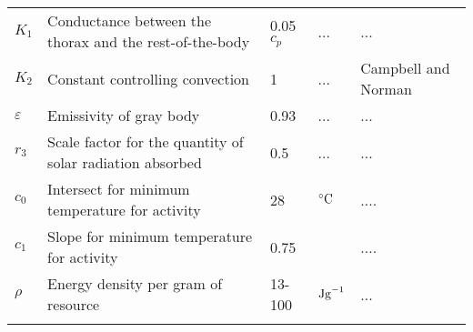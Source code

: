 \begin{sidewaystable}
\begin{tabular}{l l l l l}
$K_1$& Conductance between the thorax and the rest-of-the-body & 0.05 $c_p$ & ... & ... \\
$K_2$& Constant controlling convection & 1   & ... & Campbell and Norman \\
$\varepsilon$& Emissivity of gray body & 0.93& ...& ... \\
$r_3$  & Scale factor for the quantity of solar radiation absorbed & 0.5 & ... & ... \\
$c_0$ & Intersect for minimum temperature for activity & 28 & $^{\circ}\rm{C}$  & ....\\
$c_1$ & Slope for minimum temperature for activity & 0.75 &  & ....\\
$\rho$ &Energy density per gram of resource & 13-100 &  $\rm{J g}^{-1}$  & ... \\  %
\hline
\label{table1}
\end{tabular}
\end{sidewaystable}

